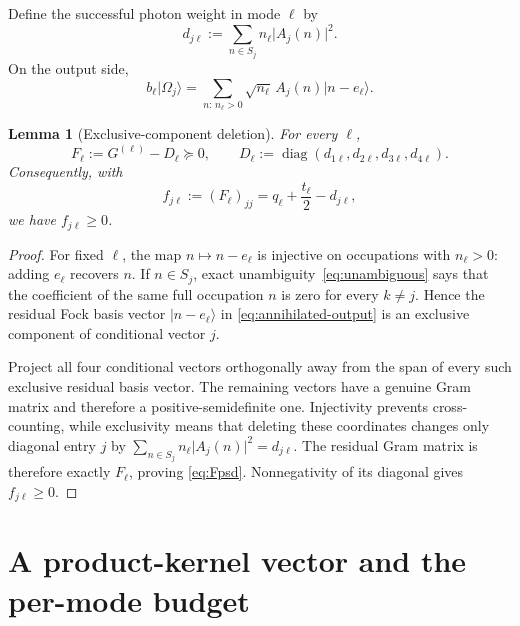 \documentclass[11pt]{article}
\newtheorem{lemma}[theorem]{Lemma}
\theoremstyle{remark}
\newcommand{\ket}[1]{\lvert #1\rangle}
\newcommand{\abs}[1]{\lvert #1\rvert}
\newcommand{\diag}{\operatorname{diag}}
\begin{document}
Define the successful photon weight in mode \(\ell\) by
\begin{equation}
  d_{j\ell}:=\sum_{n\in S_j}n_\ell\abs{A_j(n)}^2.
  \label{eq:ddef}
\end{equation}
On the output side,
\begin{equation}
  b_\ell\ket{\Omega_j}
   =\sum_{n:\,n_\ell>0}\sqrt{n_\ell}\,A_j(n)\ket{n-e_\ell}.
  \label{eq:annihilated-output}
\end{equation}

\begin{lemma}[Exclusive-component deletion]
\label{lem:delete}
For every \(\ell\),
\begin{equation}
  F_\ell:=G^{(\ell)}-D_\ell\succeq0,
  \qquad
  D_\ell:=\diag(d_{1\ell},d_{2\ell},d_{3\ell},d_{4\ell}).
  \label{eq:Fpsd}
\end{equation}
Consequently, with
\begin{equation}
  f_{j\ell}:=(F_\ell)_{jj}
    =q_\ell+\frac{t_\ell}{2}-d_{j\ell},
  \label{eq:fdef}
\end{equation}
we have \(f_{j\ell}\ge0\).
\end{lemma}

\begin{proof}
For fixed \(\ell\), the map \(n\mapsto n-e_\ell\) is injective on occupations
with \(n_\ell>0\): adding \(e_\ell\) recovers \(n\). If \(n\in S_j\), exact
unambiguity~\cref{eq:unambiguous} says that the coefficient of the same full
occupation \(n\) is zero for every \(k\ne j\). Hence the residual Fock basis
vector \(\ket{n-e_\ell}\) in \cref{eq:annihilated-output} is an exclusive
component of conditional vector \(j\).

Project all four conditional vectors orthogonally away from the span of every
such exclusive residual basis vector. The remaining vectors have a genuine
Gram matrix and therefore a positive-semidefinite one. Injectivity prevents
cross-counting, while exclusivity means that deleting these coordinates changes
only diagonal entry \(j\) by
\(\sum_{n\in S_j}n_\ell\abs{A_j(n)}^2=d_{j\ell}\). The residual Gram matrix is
therefore exactly \(F_\ell\), proving \cref{eq:Fpsd}. Nonnegativity of its
diagonal gives \(f_{j\ell}\ge0\).
\end{proof}

\section{A product-kernel vector and the per-mode budget}
\label{sec:permode}
\end{document}
